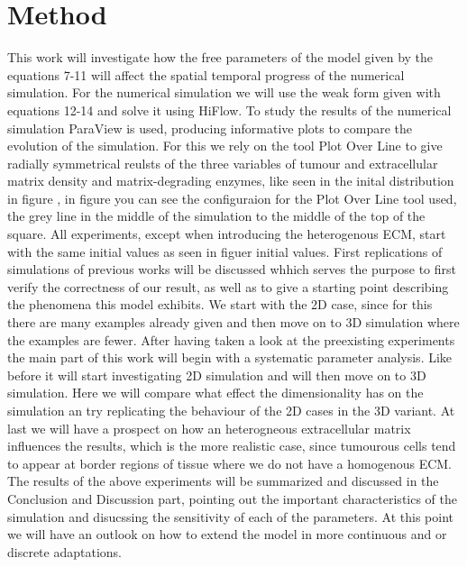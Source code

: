 \section{Method}


This work will investigate how the free parameters of the model given by the equations 7-11 will affect the spatial temporal progress of the numerical simulation. For the numerical simulation we will use the weak form given with equations 12-14 and solve it using HiFlow. To study the results of the numerical simulation ParaView is used, producing informative plots to compare the evolution of the simulation. For this we rely on the tool Plot Over Line to give radially symmetrical reulsts of the three variables of tumour and extracellular matrix density and matrix-degrading enzymes, like seen in the inital distribution in figure , in figure you can see the configuraion for the Plot Over Line tool used, the grey line in the middle of the simulation to the middle of the top of the square.\newline
All experiments, except when introducing the heterogenous ECM, start with the same initial values as seen in figuer initial values.\newline 
First replications of simulations of previous works will be discussed whhich serves the purpose to first verify the correctness of our result, as well as to give a starting point describing the phenomena this model exhibits. We start with the 2D case, since for this there are many examples already given and then move on to 3D simulation where the examples are fewer. \newline
After having taken a look at the preexisting experiments the main part of this work will begin with a systematic parameter analysis. Like before it will start investigating 2D simulation and will then move on to 3D simulation. Here we will compare what effect the dimensionality has on the simulation an try replicating the behaviour of the 2D cases in the 3D variant. \newline
At last we will have a prospect on how an heterogneous extracellular matrix influences the results, which is the more realistic case, since tumourous cells tend to appear at border regions of tissue where we do not have a homogenous ECM. \newline
The results of the above experiments will be summarized and discussed in the Conclusion and Discussion part, pointing out the important characteristics of the simulation and disucssing the sensitivity of each of the parameters. At this point we will have an outlook on how to extend the model in more continuous and or discrete adaptations.

